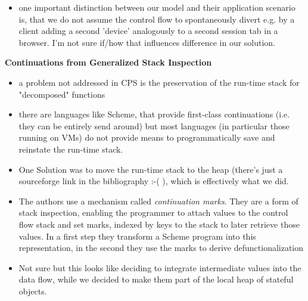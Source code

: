 \begin{itemize}
\begin{itemize}
    \end{itemize}
    \item one important distinction between our model and their application scenario is, that we do not assume the control flow to spontaneously divert e.g. by a client adding a second 'device' analogously to a second session tab in a browser. I'm not sure if/how that influences difference in our solution.
\end{itemize}

\textbf{Continuations from Generalized Stack Inspection}
\begin{itemize}
    \item a problem not addressed in CPS is the preservation of the run-time stack for "decomposed" functions
    \item there are languages like Scheme, that provide first-class continuations (i.e. they can be entirely send around) but most languages (in particular those running on VMs) do not provide means to programmatically save and reinstate the run-time stack. 
    \item One Solution was to move the run-time stack to the heap (there's just a sourceforge link in the bibliography :-( ), which is effectively what we did.
    \item The authors use a mechanism called \emph{continuation marks}. They are a form of stack inspection, enabling the programmer to attach values to the control flow stack and set marks, indexed by keys to the stack to later retrieve those values. In a first step they transform a Scheme program into this representation, in the second they use the marks to derive defunctionalization
    \item \means Not sure but this looks like deciding to integrate intermediate values into the data flow, while we decided to make them part of the local heap of stateful objects.
\end{itemize}


